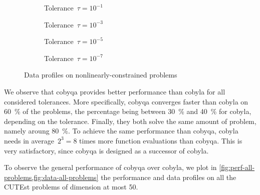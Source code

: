 \begin{figure}[ht]
    \centering
    \begin{subfigure}[b]{0.49\textwidth}
        \centering
        \caption{Tolerance~$\tau = 10^{-1}$}
    \end{subfigure}
    \hfill
    \begin{subfigure}[b]{0.49\textwidth}
        \centering
        \caption{Tolerance~$\tau = 10^{-3}$}
    \end{subfigure}
    \begin{subfigure}[b]{0.49\textwidth}
        \centering
        \caption{Tolerance~$\tau = 10^{-5}$}
    \end{subfigure}
    \hfill
    \begin{subfigure}[b]{0.49\textwidth}
        \centering
        \caption{Tolerance~$\tau = 10^{-7}$}
    \end{subfigure}
    \caption{Data profiles on nonlinearly-constrained problems}
    \label{fig:data-nonlinearly-constrained-problems}
\end{figure}

We observe that \gls{cobyqa} provides better performance than \gls{cobyla} for all considered tolerances.
More specifically, \gls{cobyqa} converges faster than \gls{cobyla} on \SI{60}{\percent} of the problems, the percentage being between \SI{30}{\percent} and \SI{40}{\percent} for \gls{cobyla}, depending on the tolerance.
Finally, they both solve the same amount of problem, namely aroung \SI{80}{\percent}.
To achieve the same performance than \gls{cobyqa}, \gls{cobyla} needs in average~$2^3 = 8$ times more function evaluations than \gls{cobyqa}.
This is very satisfactory, since \gls{cobyqa} is designed as a successor of \gls{cobyla}.

To observe the general performance of \gls{cobyqa} over \gls{cobyla}, we plot in \cref{fig:perf-all-problems,fig:data-all-problems} the performance and data profiles on all the CUTEst problems of dimension at most \num{50}.


